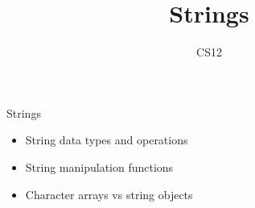 \documentclass{beamer}
\title{Strings}
\author{CS12}
\date{}
\begin{document}
\begin{frame}
    \titlepage
\end{frame}

\begin{frame}{Strings}
    \begin{itemize}
        \item String data types and operations
        \item String manipulation functions
        \item Character arrays vs string objects
    \end{itemize}
\end{frame}
\end{document}

